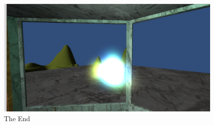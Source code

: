 \documentclass[a4paper]{article}
\begin{document}
\begin{figure}[htbp]
	\centering
		\includegraphics[width=1.0\textwidth]{end.png}
	\caption{The End}
\end{figure}



\end{document}
